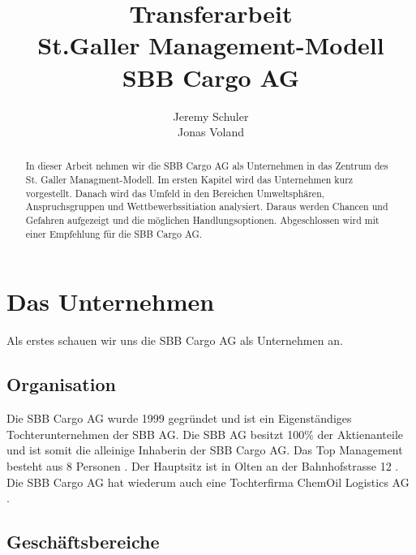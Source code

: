 \documentclass{article}
\title{
    Transferarbeit
    \\St.Galler Management-Modell
    \\SBB Cargo AG}
\author{
    Jeremy Schuler\\
    Jonas Voland
}
\begin{document}
\begin{titlepage}
    \maketitle
\end{titlepage}

\setcounter{page}{2}

\begin{abstract}
In dieser Arbeit nehmen wir die SBB Cargo AG als Unternehmen in das Zentrum des St. Galler Managment-Modell.
Im ersten Kapitel wird das Unternehmen kurz vorgestellt.
Danach wird das Umfeld in den Bereichen Umweltsphären, Anspruchsgruppen und Wettbewerbssitiation analysiert.
Daraus werden Chancen und Gefahren aufgezeigt und die möglichen Handlungsoptionen.
Abgeschlossen wird mit einer Empfehlung für die SBB Cargo AG.
\end{abstract}

\tableofcontents

\newpage

\section{Das Unternehmen}

Als erstes schauen wir uns die SBB Cargo AG als Unternehmen an.

\subsection{Organisation}

Die SBB Cargo AG wurde 1999 gegründet und ist ein Eigenständiges Tochterunternehmen der SBB AG.
Die SBB AG besitzt 100\% der Aktienanteile und ist somit die alleinige Inhaberin der SBB Cargo AG.
Das Top Management besteht aus 8 Personen \parencite[o. S.]{managmentOrganigram}.
Der Hauptsitz ist in Olten an der Bahnhofstrasse 12 \parencite[o. S.]{standorte}.
Die SBB Cargo AG hat wiederum auch eine Tochterfirma ChemOil Logistics AG \parencite[o. S.]{chemOil}.

\subsection{Geschäftsbereiche}
\end{document}

